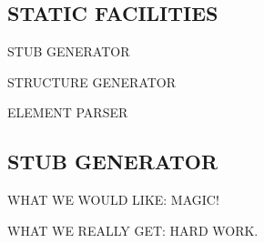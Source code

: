 \begin{bwslide}
\begin{tgrind}\scriptsize
\let\linebox=\relax
\def\_{\ifstring{\char'137}\else\underline{\ }\fi}
\relax
\end{tgrind}
\end{bwslide}


\begin{bwslide}
\part	{STATIC FACILITIES}\bf

\begin{nrtc}
\item	STUB GENERATOR

\item	STRUCTURE GENERATOR

\item	ELEMENT PARSER
\end{nrtc}
\end{bwslide}




\begin{bwslide}
\part*	{STUB GENERATOR}\bf

\begin{nrtc}
\item	WHAT WE WOULD LIKE: MAGIC!

\item	WHAT WE REALLY GET: HARD WORK.
\end{nrtc}
\end{bwslide}


